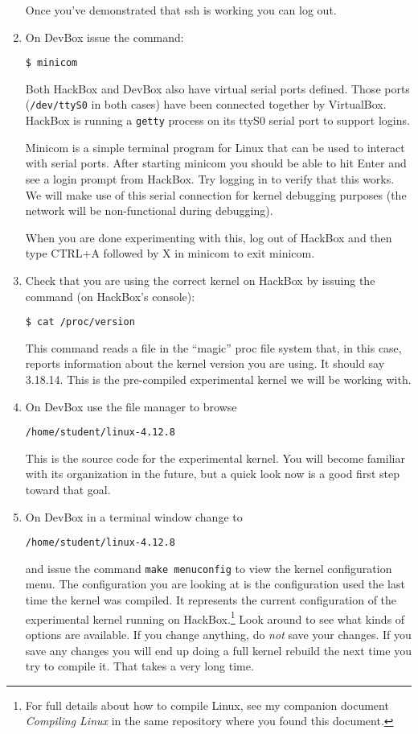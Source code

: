 \documentclass[twocolumn]{article}
\begin{document}
\begin{enumerate}
  Once you've demonstrated that ssh is working you can log out.

\item On DevBox issue the command:
\begin{Verbatim}
$ minicom
\end{Verbatim}
  Both HackBox and DevBox also have virtual serial ports defined. Those ports
  (\texttt{/dev/ttyS0} in both cases) have been connected together by VirtualBox. HackBox is
  running a \texttt{getty} process on its ttyS0 serial port to support logins.

  Minicom is a simple terminal program for Linux that can be used to interact with serial ports.
  After starting minicom you should be able to hit Enter and see a login prompt from HackBox.
  Try logging in to verify that this works. We will make use of this serial connection for
  kernel debugging purposes (the network will be non-functional during debugging).

  When you are done experimenting with this, log out of HackBox and then type CTRL+A followed by
  X in minicom to exit minicom.

\item Check that you are using the correct kernel on HackBox by issuing the command (on
  HackBox's console):
\begin{Verbatim}
$ cat /proc/version
\end{Verbatim}
  This command reads a file in the ``magic'' proc file system that, in this case, reports
  information about the kernel version you are using. It should say 3.18.14. This is the
  pre-compiled experimental kernel we will be working with.

\item On DevBox use the file manager to browse
\begin{Verbatim}
/home/student/linux-4.12.8
\end{Verbatim}
  This is the source code for the experimental kernel. You will become familiar with its
  organization in the future, but a quick look now is a good first step toward that goal.

\item On DevBox in a terminal window change to
\begin{Verbatim}
/home/student/linux-4.12.8
\end{Verbatim}
  and issue the command \texttt{make menuconfig} to view the kernel configuration menu. The
  configuration you are looking at is the configuration used the last time the kernel was
  compiled. It represents the current configuration of the experimental kernel running on
  HackBox.\footnote{For full details about how to compile Linux, see my companion document
    \textit{Compiling Linux} in the same repository where you found this document.} Look around
  to see what kinds of options are available. If you change anything, do \emph{not} save your
  changes. If you save any changes you will end up doing a full kernel rebuild the next time you
  try to compile it. That takes a very long time.


\end{enumerate}
\end{document}
